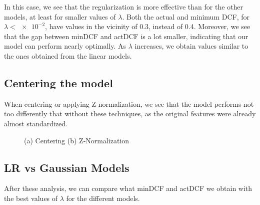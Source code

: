 \documentclass[12pt, a4paper]{article}
\begin{document}
In this case, we see that the regularization is more effective than for the other models, at least for smaller values of $\lambda$. Both the actual and minimum DCF, for $\lambda < \num{e-2}$, have values in the vicinity of 0.3, instead of 0.4. Moreover, we see that the gap between minDCF and actDCF is a lot smaller, indicating that our model can perform nearly optimally. As $\lambda$ increases, we obtain values similar to the ones obtained from the linear models.

\subsection{Centering the model}
When centering or applying Z-normalization, we see that the model performs not too differently that without these techniques, as the original features were already almost standardized.

\begin{figure}[ht]
    \centering
    \caption{(a) Centering (b) Z-Normalization}
    \label{fig:LR_affine}
\end{figure}

\subsection{LR vs Gaussian Models}
After these analysis, we can compare what minDCF and actDCF we obtain with the best values of $\lambda$ for the different models.
\end{document}
